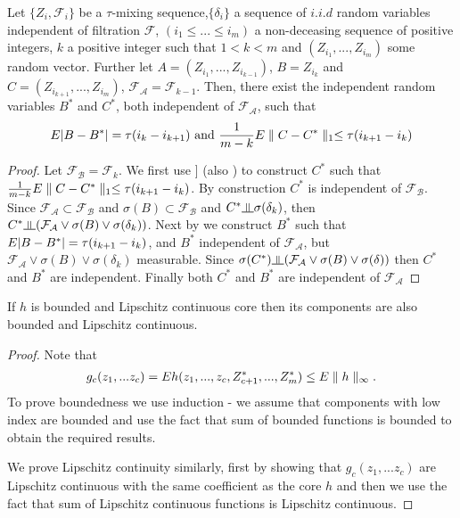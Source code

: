\begin{lemma}
\label{lem:complicated}
Let $\{Z_i,\mathcal{F}_i\}$ be a $\tau$-mixing sequence,$\{ \delta_i \}$ a sequence of $i.i.d$ random variables independent of filtration $\mathcal{F}$, $(i_1\leq ... \leq i_m)$ a non-deceasing sequence of positive integers, $k$ a positive integer such that $1 < k < m$ and $(Z_{i_1},...,Z_{i_m})$ some random vector. Further let $A = (Z_{i_1},...,Z_{i_{k-1}})$, $B= Z_{i_k}$ and $C=(Z_{i_{k+1}},...,Z_{i_{m}})$,  $\mathcal{F_A} =\mathcal{F}_{k-1}$. Then, there exist the independent random variables $B^*$ and $C^*$, both independent of $\mathcal{F_A}$, such that 
\begin{align}
E |B-B^*| = \tau(i_{k} -i_{k+1}) \text{ and } \frac{1} {m-k} E \parallel C-C^* \parallel_1 \leq \tau(i_{k+1}-i_k) 
\end{align}    
\end{lemma}


\begin{proof}
Let $\mathcal{F_B}  =\mathcal{F}_{k}$. We first use  \cite[Equation 2.1]{leucht_dependent_2013}] (also \cite[Lemma 5.3]{dedecker2007weak}) to construct $C^*$ such that $\frac{1} {m-k}  E \parallel C-C^* \parallel_1 \leq  \tau(i_{k+1}-i_k)$. By construction $C^*$ is independent of $\mathcal{F_B}$. Since $ \mathcal{F_A} \subset \mathcal{F_B}$ and $ \sigma(B) \subset \mathcal{F_B}$ and $C^* \indep \sigma(\delta_k) $, then $C^* \indep  (\mathcal{F_A} \vee \sigma(B)  \vee \sigma(\delta_k)  )$. Next by \cite[Lemma 5.2]{dedecker2007weak} we construct $B^*$  such  that $E |B-B^*| = \tau(i_{k+1} -i_{k})$, and $B^*$  independent  of $\mathcal{F_A}$, but $\mathcal{F_A} \vee \sigma(B) \vee \sigma(\delta_k)$ measurable. Since   $\sigma(C^*) \indep (\mathcal{F_A} \vee \sigma(B) \vee \sigma(\delta)) $ then $C^*$ and $B^*$ are independent. Finally both $C^*$ and $B^*$ are independent of $\mathcal{F_A}$    
\end{proof}


 
 
 
\begin{lemma}
\label{stm:LipAndBound}
 If $h$ is bounded and Lipschitz continuous core then its components are also bounded and Lipschitz continuous.
\end{lemma}
\begin{proof}
 Note that 
\begin{align}
g_c(z_1,...z_c) = E h(z_1,...,z_c,Z_{c+1}^*,...,Z_{m}^*) \leq E \parallel h \parallel_{\infty}.  
\end{align}
To prove boundedness  we use induction - we assume that components with low index are bounded and use the fact that sum of bounded functions is bounded to obtain the required results.

We prove Lipschitz continuity similarly, first by showing that $g_c(z_1,...z_c)$ are Lipschitz continuous with the same coefficient as the core $h$ and then we use the fact that sum of Lipschitz continuous functions  is  Lipschitz continuous.
\end{proof}


